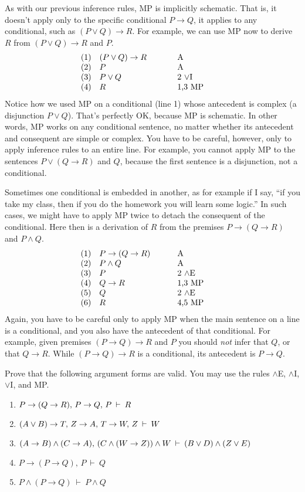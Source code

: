 As with our previous inference rules, MP is implicitly schematic.
That is, it doesn't apply only to the specific conditional $P\to Q$,
it applies to any conditional, such as $(P\vee Q)\to R$.  For example,
we can use MP now to derive $R$ from $(P\vee Q)\to R$ and $P$.
\[ \begin{array}{l >{$}p{3cm}<{$} p{2cm}}
     (1) & (P\vee Q)\to R & A  \\
     (2) & P    & A  \\
     (3) & P\vee Q & 2 $\vee$I  \\
     (4) & R & 1,3 MP \end{array} \] Notice how we used
MP on a conditional (line 1) whose antecedent is complex (a
disjunction $P\vee Q$).
That's perfectly OK, because MP is schematic.  In other words, MP
works on any conditional sentence, no matter whether its antecedent
and consequent are simple or complex.  You have to be careful,
however, only to apply inference rules to an entire line.  For
example, you cannot apply MP to the sentences $P\vee (Q\to R)$ and
$Q$, because the first sentence is a disjunction, not a conditional.

Sometimes one conditional is embedded in another, as for example if I
say, ``if you take my class, then if you do the homework you will
learn some logic.''  In such cases, we might have to apply MP twice
to detach the consequent of the conditional.  Here then is a
derivation of $R$ from the premises $P\to (Q\to R)$ and $P\wedge Q$.
\[ \begin{array}{l >{$}p{3cm}<{$} p{2cm}}
     (1) & P\to (Q\to R) & A \\
     (2) & P\wedge Q     & A \\
     (3) & P             & 2 $\wedge$E \\
     (4) & Q\to R        & 1,3 MP \\
     (5) & Q             & 2 $\wedge$E \\
     (6) & R             & 4,5 MP \end{array} \]
Again, you have to be careful only to apply MP when the main
sentence on a line is a conditional, and you also have the antecedent
of that conditional.  For example, given premises $(P\to Q)\to R$ and
$P$ you should {\it not} infer that $Q$, or that $Q\to R$.  While
$(P\to Q)\to R$ is a conditional, its antecedent is $P\to Q$.

\begin{exercise} Prove that the following argument forms are valid.
  You may use the rules $\wedge$E, $\wedge$I, $\vee$I, and MP.
  \begin{enumerate}
\item $P\rightarrow (Q\rightarrow R),\,P\rightarrow Q,\,P\:\vdash\: R$
\item $(A\vee B)\rightarrow T,\,Z\rightarrow A,\,T\rightarrow W,\,Z\:\vdash\:W$
\item $(A\rightarrow  B)\wedge (C\rightarrow A),\,(C\wedge (W\rightarrow  Z))\wedge W\:\vdash\:(B\vee D)\wedge  (Z\vee E)$
\item $P\to (P\to Q),\,P\:\vdash\: Q$
\item $P\wedge (P\to Q)\:\vdash\: P\wedge Q$  
\end{enumerate} \end{exercise}

